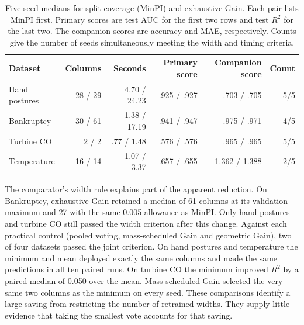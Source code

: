 \begin{table}[htbp]
\centering
\caption{Five-seed medians for split coverage (MinPI) and exhaustive Gain. Each pair lists MinPI first. Primary scores are test AUC for the first two rows and test $R^2$ for the last two. The companion scores are accuracy and MAE, respectively. Counts give the number of seeds simultaneously meeting the width and timing criteria.}
\label{tab:base-external}
\small
\begin{tabular}{lrrrrr}
\toprule
Dataset & Columns & Seconds & Primary score & Companion score & Count\\
\midrule
Hand postures & 28 / 29 & 4.70 / 24.23 & .925 / .927 & .703 / .705 & 5/5\\
Bankruptcy    & 30 / 61 & 1.38 / 17.19 & .941 / .947 & .975 / .971 & 4/5\\
Turbine CO    & 2 / 2   & .77 / 1.48 & .576 / .576 & .965 / .965 & 5/5\\
Temperature   & 16 / 14 & 1.07 / 3.37 & .657 / .655 & 1.362 / 1.388 & 2/5\\
\bottomrule
\end{tabular}
\end{table}

The comparator's width rule explains part of the apparent reduction. On Bankruptcy, exhaustive Gain retained a median of 61 columns at its validation maximum and 27 with the same 0.005 allowance as MinPI. Only hand postures and turbine CO still passed the width criterion after this change. Against each practical control (pooled voting, mass-scheduled Gain and geometric Gain), two of four datasets passed the joint criterion. On hand postures and temperature the minimum and mean deployed exactly the same columns and made the same predictions in all ten paired runs. On turbine CO the minimum improved $R^2$ by a paired median of 0.050 over the mean. Mass-scheduled Gain selected the very same two columns as the minimum on every seed. These comparisons identify a large saving from restricting the number of retrained widths. They supply little evidence that taking the smallest vote accounts for that saving.
